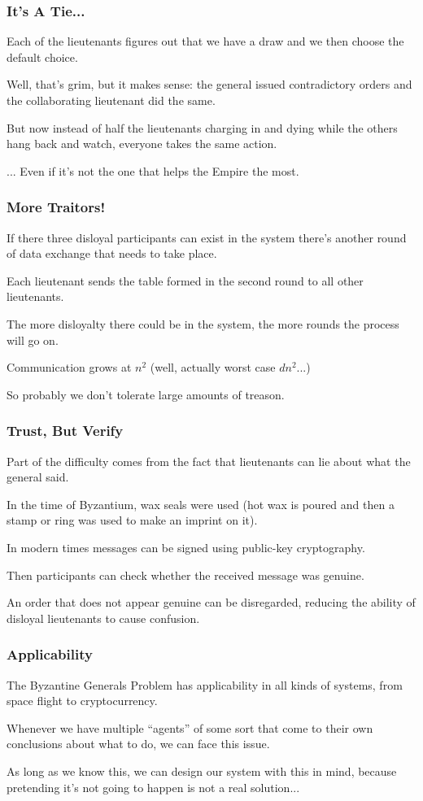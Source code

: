 \begin{frame}
	\frametitle{It's A Tie...}

	Each of the lieutenants figures out that we have a draw and we then choose the default choice.

	Well, that's grim, but it makes sense: the general issued contradictory orders and the collaborating lieutenant did the same.

	But now instead of half the lieutenants charging in and dying while the others hang back and watch, everyone takes the same action.

	... Even if it's not the one that helps the Empire the most.


\end{frame}

\begin{frame}
	\frametitle{More Traitors!}

	If there three disloyal participants can exist in the system there's another round of data exchange that needs to take place.

	Each lieutenant sends the table formed in the second round to all other lieutenants.

	The more disloyalty there could be in the system, the more rounds the process will go on.

	Communication grows at $n^{2}$ (well, actually worst case $dn^{2}$...)

	So probably we don't tolerate large amounts of treason.

\end{frame}

\begin{frame}
	\frametitle{Trust, But Verify}

	Part of the difficulty comes from the fact that lieutenants can lie about what the general said.

	In the time of Byzantium, wax seals were used (hot wax is poured and then a stamp or ring was used to make an imprint on it).

	In modern times messages can be signed using public-key cryptography.

	Then participants can check whether the received message was genuine.

	An order that does not appear genuine can be disregarded, reducing the ability of disloyal lieutenants to cause confusion.

\end{frame}

\begin{frame}
	\frametitle{Applicability}

	The Byzantine Generals Problem has applicability in all kinds of systems, from space flight to cryptocurrency.

	Whenever we have multiple ``agents'' of some sort that come to their own conclusions about what to do, we can face this issue.

	As long as we know this, we can design our system with this in mind, because pretending it's not going to happen is not a real solution...


\end{frame}





